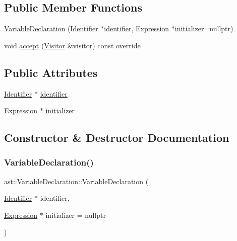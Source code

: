 \subsection*{Public Member Functions}
\begin{DoxyCompactItemize}
\item 
\hyperlink{structast_1_1_variable_declaration_a1a46a23c570f9aed8e9be68dc971eb7e}{Variable\+Declaration} (\hyperlink{structast_1_1_identifier}{Identifier} $\ast$\hyperlink{structast_1_1_variable_declaration_a8a2202289d0892692a65b4c2bfc55a51}{identifier}, \hyperlink{structast_1_1_expression}{Expression} $\ast$\hyperlink{structast_1_1_variable_declaration_a8af6307b760a4edb788df032220ed252}{initializer}=nullptr)
\item 
void \hyperlink{structast_1_1_variable_declaration_a527c093e1d79f85af3176428e57fc512}{accept} (\hyperlink{structast_1_1_visitor}{Visitor} \&visitor) const override
\end{DoxyCompactItemize}
\subsection*{Public Attributes}
\begin{DoxyCompactItemize}
\item 
\hyperlink{structast_1_1_identifier}{Identifier} $\ast$ \hyperlink{structast_1_1_variable_declaration_a8a2202289d0892692a65b4c2bfc55a51}{identifier}
\item 
\hyperlink{structast_1_1_expression}{Expression} $\ast$ \hyperlink{structast_1_1_variable_declaration_a8af6307b760a4edb788df032220ed252}{initializer}
\end{DoxyCompactItemize}


\subsection{Constructor \& Destructor Documentation}
\mbox{\label{structast_1_1_variable_declaration_a1a46a23c570f9aed8e9be68dc971eb7e}} 
\subsubsection{\texorpdfstring{Variable\+Declaration()}{VariableDeclaration()}}
{\footnotesize\ttfamily ast\+::\+Variable\+Declaration\+::\+Variable\+Declaration (\begin{DoxyParamCaption}\item[{\hyperlink{structast_1_1_identifier}{Identifier} $\ast$}]{identifier,  }\item[{\hyperlink{structast_1_1_expression}{Expression} $\ast$}]{initializer = {\ttfamily nullptr} }\end{DoxyParamCaption})\hspace{0.3cm}{\ttfamily [inline]}}



